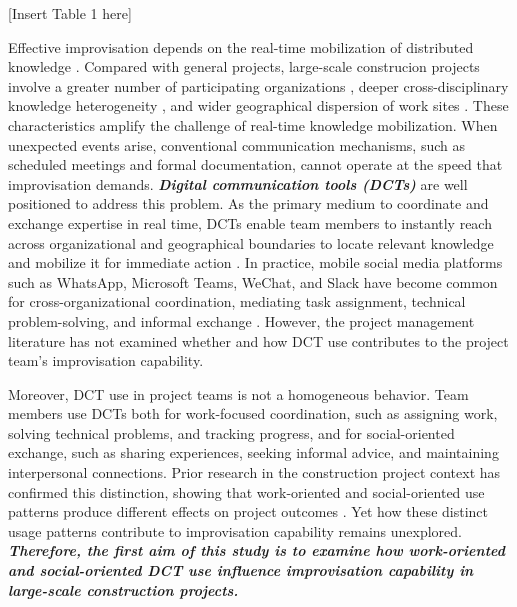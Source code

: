 \documentclass[authoryear,preprint,review,times,10pt]{elsarticle}
\begin{document}
\begin{center}[Insert Table 1 here]\end{center}

Effective improvisation depends on the real-time mobilization of distributed knowledge \citep{magni2009Role, moorman1998Organizational}. Compared with general projects, large-scale construcion projects involve a greater number of participating organizations \citep{hu2024Performance}, deeper cross-disciplinary knowledge heterogeneity \citep{yang2025How}, and wider geographical dispersion of work sites \citep{shen2022Largescale}. These characteristics amplify the challenge of real-time knowledge mobilization. When unexpected events arise, conventional communication mechanisms, such as scheduled meetings and formal documentation, cannot operate at the speed that improvisation demands. \textbf{\textit{Digital communication tools (DCTs)}} are well positioned to address this problem. As the primary medium to coordinate and exchange expertise in real time, DCTs enable team members to instantly reach across organizational and geographical boundaries to locate relevant knowledge and mobilize it for immediate action \citep{zhang2018Mobile}. In practice, mobile social media platforms such as WhatsApp, Microsoft Teams, WeChat, and Slack have become common for cross-organizational coordination, mediating task assignment, technical problem-solving, and informal exchange \citep{ma2022Investigating, jia2025Knowledge}. However, the project management literature has not examined whether and how DCT use contributes to the project team's improvisation capability. 

Moreover, DCT use in project teams is not a homogeneous behavior. Team members use DCTs both for work-focused coordination, such as assigning work, solving technical problems, and tracking progress, and for social-oriented exchange, such as sharing experiences, seeking informal advice, and maintaining interpersonal connections. Prior research in the construction project context has confirmed this distinction, showing that work-oriented and social-oriented use patterns produce different effects on project outcomes \citep{ma2022Understanding, jiang2026Bolstering}. Yet how these distinct usage patterns contribute to improvisation capability remains unexplored. \textbf{\textit{Therefore, the first aim of this study is to examine how work-oriented and social-oriented DCT use influence improvisation capability in large-scale construction projects.}}
\end{document}
